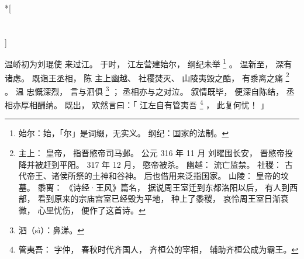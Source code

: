 
\switchcolumn[0]*[\section{}]

温峤初为刘琨使
来过江。
于时，
江左营建始尔，
纲纪未举%
\footnote{%
    始尔：始，「尔」是词缀，无实义。
    纲纪：国家的法制。
}%
。
温新至，
深有诸虑。
既诣王丞相，
陈
主上幽越、
社稷焚灭、
山陵夷毁之酷，
有黍离之痛%
\footnote{%
    主上：
        皇帝，
        指晋愍帝司马邺。
        公元 316 年 11 月
        刘曜围长安，
        晋愍帝投降并被赶到平阳。
        317 年 12 月，
        愍帝被杀。
    幽越：
        流亡监禁。
    社稷：
        古代帝王、诸侯所祭的土神和谷神。
        后也借用来泛指国家。
    山陵：
        皇帝的坟墓。
    黍离：
        《诗经·王风》篇名，
        据说周王室迁到东都洛阳以后，
        有人到西部，
        看到原来的宗庙宫室已经毁为平地，
        种上了黍稷，
        哀怜周王室日渐衰微，
        心里忧伤，
        便作了这首诗。
}%
。
温
忠慨深烈，
言与泗俱%
\footnote{%
    泗（sì）：鼻涕。
}%
；
丞相亦与之对泣。
叙情既毕，
便深自陈结，
丞相亦厚相酬纳。
既出，
欢然言曰：「
    江左自有管夷吾%
    \footnote{%
        管夷吾：
            字仲，
            春秋时代齐国人，
            齐桓公的宰相，
            辅助齐桓公成为霸王。
    }%
    ，
    此复何忧！
」

\switchcolumn



